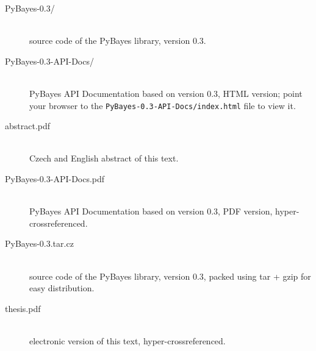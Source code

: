 \documentclass[a4paper,12pt,oneside]{report}
\begin{document}
	\begin{description}
		\item[PyBayes-0.3/] \hfill \\
			source code of the PyBayes library, version 0.3.
		\item[PyBayes-0.3-API-Docs/] \hfill \\
			PyBayes API Documentation based on version 0.3, HTML version; point your browser to the
			\nolinkurl{PyBayes-0.3-API-Docs/index.html} file to view it.
		\item[abstract.pdf] \hfill \\
			Czech and English abstract of this text.
		\item[PyBayes-0.3-API-Docs.pdf] \hfill \\
			PyBayes API Documentation based on version 0.3, PDF version, hyper-cross\-referenced.
		\item[PyBayes-0.3.tar.cz] \hfill \\
			source code of the PyBayes library, version 0.3, packed using tar + gzip for easy
			distribution.
		\item[thesis.pdf] \hfill \\
			electronic version of this text, hyper-crossreferenced.
	\end{description}

\fi
\end{document}

